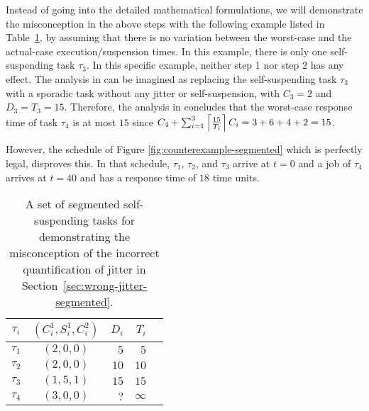 Instead of going into the detailed mathematical formulations, we will demonstrate the misconception  in the above steps with the following example listed in Table~\ref{tab:counterexample-segmented}, by assuming that there is no variation between the worst-case and the actual-case execution/suspension times.
In this example, there is only one self-suspending task $\tau_3$. In
this specific example,  neither step 1 nor step 2 has any effect. The
analysis in \cite{RTCSA-BletsasA05} can be imagined as replacing the
self-suspending task $\tau_3$ with a sporadic task without any jitter or self-suspension, with $C_3=2$ and $D_3=T_3=15$. Therefore, the analysis in \cite{RTCSA-BletsasA05}  concludes that the worst-case response time of task $\tau_4$ is at most $15$ since $C_4+\sum_{i=1}^{3}\left\lceil{\frac{15}{T_i}}\right\rceil C_i = 3+ 6 + 4 + 2= 15$.


However, the schedule of Figure \ref{fig:counterexample-segmented} which is perfectly legal, disproves this.
In that schedule, $\tau_1$, $\tau_2$, and $\tau_3$ arrive at $t=0$ and a job of $\tau_4$ arrives at $t=40$ and has a response time of 
$18$ time units.

\begin{table}[t]
\begin{center}
\begin{tabular}{|c||c|r|r|r|}
\hline
$\tau_i$ & $(C_i^1, S_i^1, C_i^2)$   &   $D_i$  &     $T_i$     \\ \hline
$\tau_1$ &  $(2, 0, 0)$                    &     $5$  &       $5$     \\ \hline
$\tau_2$ &  $(2, 0, 0)$                    &    $10$  &      $10$     \\ \hline
$\tau_3$ &  $(1, 5, 1)$            &    $15$  &      $15$     \\ \hline
$\tau_4$ &  $(3, 0, 0)$                   &    $?$  &   $\infty$    \\ \hline     
\end{tabular}
\end{center}
\caption{A set of segmented self-suspending tasks for demonstrating the misconception of the incorrect quantification of jitter in Section~\ref{sec:wrong-jitter-segmented}.}
\label{tab:counterexample-segmented}
\end{table}

